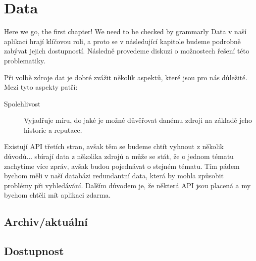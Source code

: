 \chapter{Data}
\label{chap:data}
Here we go, the first chapter! We need to be checked by grammarly
Data v naší aplikaci hrají klíčovou roli, a proto se v následující kapitole budeme podrobně zabývat jejich dostupností. Následně provedeme diskuzi o možnostech řešení této problematiky.

Při volbě zdroje dat je dobré zvážit několik aspektů, které jsou pro nás důležité. Mezi tyto aspekty patří:
\begin{description}
    \item[Spolehlivost] Vyjadřuje míru, do jaké je možné důvěřovat danému zdroji na základě jeho historie a reputace.
\end{description}
Existují API třetích stran, avšak těm se budeme chtít vyhnout z několik důvodů... sbírají data z několika zdrojů a může se stát, že o jednom tématu zachytíme více zpráv, avšak budou pojednávat o stejném tématu. Tím pádem bychom měli v naší databázi redundantní data, která by mohla způsobit problémy při vyhledávání. Dalším důvodem je, že některá API jsou placená a my bychom chtěli mít aplikaci zdarma.
\section{Archiv/aktuální}
\section{Dostupnost}


